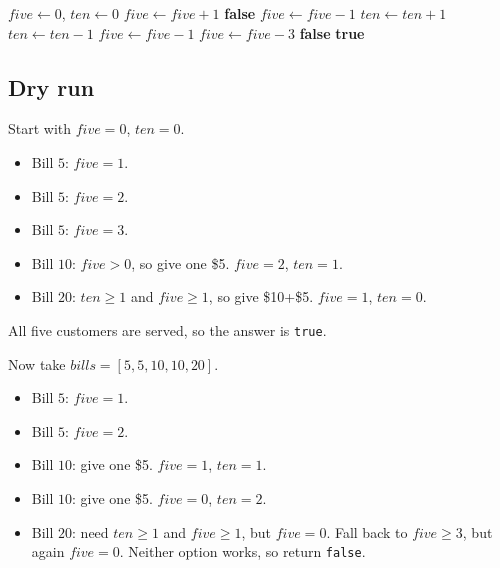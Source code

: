 \begin{algorithm}[H]
\caption{Lemonade Change}
\begin{algorithmic}[1]
  \State $\textit{five} \gets 0$, $\textit{ten} \gets 0$
      \State $\textit{five} \gets \textit{five} + 1$
       \Return \textbf{false} \EndIf
      \State $\textit{five} \gets \textit{five} - 1$
      \State $\textit{ten} \gets \textit{ten} + 1$
    \Else {}
        \State $\textit{ten} \gets \textit{ten} - 1$
        \State $\textit{five} \gets \textit{five} - 1$
        \State $\textit{five} \gets \textit{five} - 3$
      \Else
        \State \Return \textbf{false}
      \EndIf
    \EndIf
  \EndFor
  \State \Return \textbf{true}
\EndProcedure
\end{algorithmic}
\end{algorithm}

\subsection*{Dry run}


Start with $\textit{five}=0$, $\textit{ten}=0$.

\begin{itemize}
  \item Bill $5$: $\textit{five}=1$.
  \item Bill $5$: $\textit{five}=2$.
  \item Bill $5$: $\textit{five}=3$.
  \item Bill $10$: $\textit{five} > 0$, so give one \$5. $\textit{five}=2$,
        $\textit{ten}=1$.
  \item Bill $20$: $\textit{ten}\ge1$ and $\textit{five}\ge1$, so give
        \$10+\$5. $\textit{five}=1$, $\textit{ten}=0$.
\end{itemize}

All five customers are served, so the answer is \texttt{true}.

Now take $\textit{bills} = [5, 5, 10, 10, 20]$.

\begin{itemize}
  \item Bill $5$: $\textit{five}=1$.
  \item Bill $5$: $\textit{five}=2$.
  \item Bill $10$: give one \$5. $\textit{five}=1$, $\textit{ten}=1$.
  \item Bill $10$: give one \$5. $\textit{five}=0$, $\textit{ten}=2$.
  \item Bill $20$: need $\textit{ten}\ge1$ and $\textit{five}\ge1$, but
        $\textit{five}=0$. Fall back to $\textit{five}\ge3$, but again
        $\textit{five}=0$. Neither option works, so return \texttt{false}.
\end{itemize}

